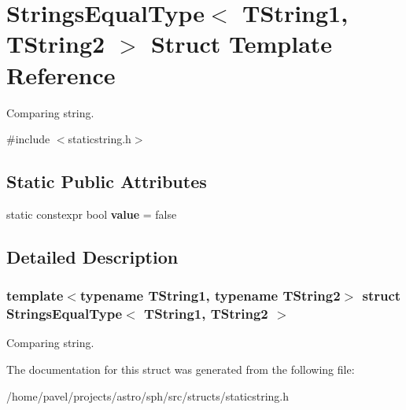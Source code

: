 \hypertarget{structStringsEqualType}{}\section{Strings\+Equal\+Type$<$ T\+String1, T\+String2 $>$ Struct Template Reference}
\label{structStringsEqualType}


Comparing string.  




{\ttfamily \#include $<$staticstring.\+h$>$}

\subsection*{Static Public Attributes}
\begin{DoxyCompactItemize}
\item 
\hypertarget{structStringsEqualType_a91b0c2fa9f3fb751da0c56ead1afddfd}{}\label{structStringsEqualType_a91b0c2fa9f3fb751da0c56ead1afddfd} 
static constexpr bool {\bfseries value} = false
\end{DoxyCompactItemize}


\subsection{Detailed Description}
\subsubsection*{template$<$typename T\+String1, typename T\+String2$>$\newline
struct Strings\+Equal\+Type$<$ T\+String1, T\+String2 $>$}

Comparing string. 

The documentation for this struct was generated from the following file\+:\begin{DoxyCompactItemize}
\item 
/home/pavel/projects/astro/sph/src/structs/staticstring.\+h\end{DoxyCompactItemize}

